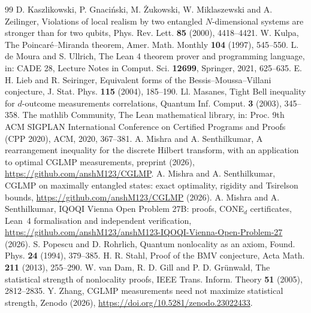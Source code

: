 \documentclass[11pt]{amsart}
\theoremstyle{definition}
\theoremstyle{remark}
\numberwithin{equation}{section}
\begin{document}
\begin{thebibliography}{99}
 D. Kaszlikowski, P. Gnaci\'nski, M. \.Zukowski, W. Miklaszewski and A. Zeilinger, Violations of local
realism by two entangled $N$-dimensional systems are stronger than for two qubits, Phys. Rev. Lett. \textbf{85} (2000),
4418--4421.
 W. Kulpa, The Poincar\'e--Miranda theorem, Amer. Math. Monthly \textbf{104} (1997), 545--550.
 L. de Moura and S. Ullrich, The Lean 4 theorem prover and programming language, in: CADE 28, Lecture
Notes in Comput. Sci. \textbf{12699}, Springer, 2021, 625--635.
 E. H. Lieb and R. Seiringer, Equivalent forms of the Bessis--Moussa--Villani conjecture, J. Stat. Phys.
\textbf{115} (2004), 185--190.
 Ll. Masanes, Tight Bell inequality for $d$-outcome measurements correlations, Quantum Inf. Comput.
\textbf{3} (2003), 345--358.
 The mathlib Community, The Lean mathematical library, in: Proc. 9th ACM SIGPLAN International
Conference on Certified Programs and Proofs (CPP 2020), ACM, 2020, 367--381.
 A. Mishra and A. Senthilkumar, A rearrangement inequality for the discrete Hilbert transform, with
an application to optimal CGLMP measurements, preprint (2026), \url{https://github.com/anshM123/CGLMP}.
 A. Mishra and A. Senthilkumar, CGLMP on maximally entangled states: exact optimality, rigidity and
Tsirelson bounds, \url{https://github.com/anshM123/CGLMP} (2026).
 A. Mishra and A. Senthilkumar, IQOQI Vienna Open Problem 27B: proofs, CONE$_d$ certificates, Lean~4
formalisation and independent verification, \url{https://github.com/anshM123/anshM123-IQOQI-Vienna-Open-Problem-27}
(2026).
 S. Popescu and D. Rohrlich, Quantum nonlocality as an axiom, Found. Phys. \textbf{24} (1994), 379--385.
 H. R. Stahl, Proof of the BMV conjecture, Acta Math. \textbf{211} (2013), 255--290.
 W. van Dam, R. D. Gill and P. D. Gr\"unwald, The statistical strength of nonlocality proofs, IEEE Trans.
Inform. Theory \textbf{51} (2005), 2812--2835.
 Y. Zhang, CGLMP measurements need not maximize statistical strength, Zenodo (2026),
\url{https://doi.org/10.5281/zenodo.23022433}.
\end{thebibliography}
\end{document}
